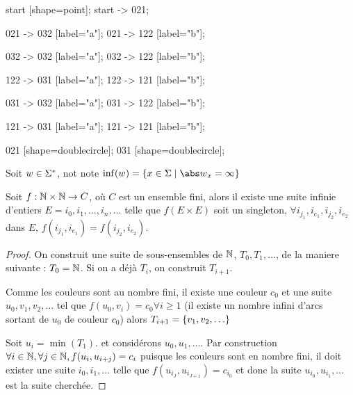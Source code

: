 \begin{exemple}
\begin{itemize}
\begin{automata}
{				      start [shape=point];
				      start -> 021;

				      021 -> 032 [label="a"];
				      021 -> 122 [label="b"];

				      032 -> 032 [label="a"];
				      032 -> 122 [label="b"];


				      122 -> 031 [label="a"];
				      122 -> 121 [label="b"];


				      031 -> 032 [label="a"];
				      031 -> 122 [label="b"];

				      121 -> 031 [label="a"];
				      121 -> 121 [label="b"];

				      021 [shape=doublecircle];
				      031 [shape=doublecircle];
			      }
		      \end{automata}
	\end{itemize}
\end{exemple}

\begin{notation}
	Soit $w \in \Sigma^{*}$, not note $\inf (w) = \setdef {x \in \alphabet} {{\abs w}_x = \infty}$
\end{notation}



\begin{theorem}
	Soit $f : \mathbb{N} \times \mathbb{N} \to C $, où $C$ est un ensemble fini, alors il existe une suite infinie d'entiers $E = i_0, i_1, \ldots, i_n, \ldots$
	telle que $f(E \times E)$ soit un singleton, \ie $\forall i_{j_1},i_{e_1},i_{j_2},i_{e_2}$ dans $E$, $f(i_{j_1},i_{e_1})=f(i_{j_2},i_{e_2})$.
\end{theorem}

\begin{proof}
	On construit une suite de sous-ensembles de $\mathbb{N}$, $T_0, T_1, \ldots$, de la maniere suivante :
	$T_0 = \mathbb{N}$. Si on a déjà $T_i$, on construit $T_{i+1}$.

	Comme les couleurs sont au nombre fini, il existe une couleur $c_0$ et une suite
	$u_0, v_1, v_2, \ldots$ tel que $f(u_0, v_i) = c_0 \forall i \geq 1$ (il existe un nombre infini d'arcs sortant de $u_0$ de couleur $c_0$)
	alors $T_{i+1} = \left\{v_1, v_2, \ldots\right\}$


	Soit $u_i = \min (T_1)$. et considérons $u_0, u_1, \ldots$. Par construction $\forall i \in \mathbb{N}, \forall j \in \mathbb{N}, f(u_i, u_{i + j}) = c_i$
	puisque les couleurs sont en nombre fini, il doit exister une suite $i_0, i_1, \ldots$ telle que $f(u_{i_J}, u_{i_{J+1}}) = c_{i_0}$
	et donc la suite $u_{i_0},u_{i_1}, \ldots$ est la suite cherchée.
\end{proof}


